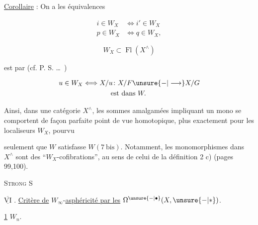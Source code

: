 \uline{Corollaire} : On a  les équivalences

\[
\begin{aligned}
i\in W_X &\Longleftrightarrow i'\in W_X\\
p\in W_X &\Longleftrightarrow q\in W_X ,
\end{aligned}
\]


\[
W_X\subset\operatorname{Fl}(X^\wedge)
\]

est  par (cf. P. S. \ldots\ )

\[
\begin{aligned}
u\in W_X &\Longleftrightarrow X/u\colon X/F\unsure{-|\longrightarrow}X/G\\
&\hspace{4em}\text{est dans }W.
\end{aligned}
\]

Ainsi, dans une catégorie $X^\wedge$, les sommes amalgamées impliquant un mono se comportent de façon parfaite  point de vue homotopique, plus exactement pour les localiseurs $W_X$, pourvu

seulement que $W$ satisfasse  $W(7\ \mathrm{bis})$. Notamment, les monomorphismes dans $X^\wedge$ sont des ``$W_X$-cofibrations'', au sens   de celui de la définition 2 c) (pages 99,100).

\textsc{Strong}  \textsc{S}


$\overline{\underline{\mathrm{VI}}}$ . \uline{Critère de} $W_\infty$-\uline{asphéricité par les} $\Omega^{\unsure{-|\bullet}}(X,\unsure{-|*})$.

\uline{1}   $W_n$.

